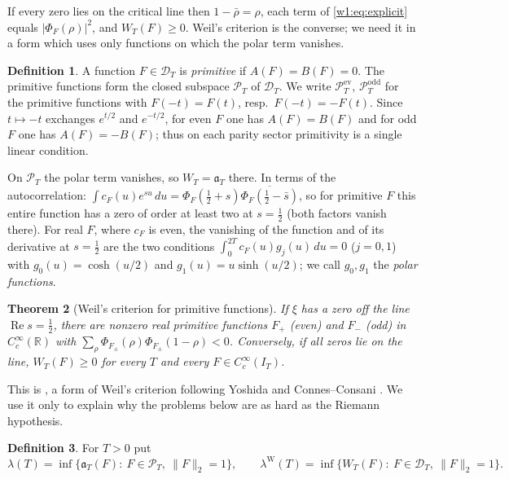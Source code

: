 \documentclass[11pt]{amsart}
\newtheorem{theorem}{Theorem}[section]
\theoremstyle{definition}
\newtheorem{definition}[theorem]{Definition}
\theoremstyle{remark}
\numberwithin{equation}{section}
\newcommand{\R}{\mathbb{R}}
\DeclareMathOperator{\Rel}{Re}
\newcommand{\IT}{I_T}                                  %
\newcommand{\cF}{c_F}                                  %
\newcommand{\PhiF}{\Phi_F}                             %
\newcommand{\PT}{\mathcal{P}_T}                        %
\newcommand{\DT}{\mathcal{D}_T}                        %
\newcommand{\aT}{\mathfrak{a}_T}                       %
\newcommand{\WT}{W_T}                                  %
\newcommand{\lam}{\lambda(T)}                          %
\newcommand{\lamW}{\lambda^{\mathrm W}(T)}             %
\begin{document}
If every zero lies on the critical line then $1-\bar\rho=\rho$, each term of
\eqref{w1:eq:explicit} equals $|\PhiF(\rho)|^2$, and $\WT(F)\ge0$. Weil's
criterion is the converse; we need it in a form which uses only functions
on which the polar term vanishes.

\begin{definition}\label{w1:def:primitive}
A function $F\in\DT$ is \emph{primitive} if $A(F)=B(F)=0$. The primitive
functions form the closed subspace $\PT$ of $\DT$. We write $\PT^{\mathrm{ev}}$,
$\PT^{\mathrm{odd}}$ for the primitive functions with $F(-t)=F(t)$,
resp.\ $F(-t)=-F(t)$. Since $t\mapsto -t$ exchanges $e^{t/2}$ and $e^{-t/2}$,
for even $F$ one has $A(F)=B(F)$ and for odd $F$ one has $A(F)=-B(F)$; thus
on each parity sector primitivity is a single linear condition.
\end{definition}

On $\PT$ the polar term vanishes, so $\WT=\aT$ there. In terms of the
autocorrelation: $\int\cF(u)e^{su}\,du=\PhiF(\frac12+s)\overline{\PhiF(\frac12-\bar s)}$,
so for primitive $F$ this entire function has a zero of order at least two at
$s=\frac12$ (both factors vanish there). For real $F$, where $\cF$ is even,
the vanishing of the function and of its derivative at $s=\frac12$ are the two
conditions $\int_0^{2T}\cF(u)g_j(u)\,du=0$ ($j=0,1$) with $g_0(u)=\cosh(u/2)$
and $g_1(u)=u\sinh(u/2)$; we call $g_0,g_1$ the \emph{polar functions}.

\begin{theorem}[Weil's criterion for primitive functions]\label{w1:thm:criterion}
If $\xi$ has a zero off the line $\Rel s=\frac12$, there are nonzero real
primitive functions $F_+$ (even) and $F_-$ (odd) in $C_c^\infty(\R)$ with
$\sum_\rho\Phi_{F_\pm}(\rho)\Phi_{F_\pm}(1-\rho)<0$. Conversely, if all zeros
lie on the line, $\WT(F)\ge0$ for every $T$ and every $F\in C_c^\infty(\IT)$.
\end{theorem}

This is \cite[Theorem~6.2]{P45}, a form of Weil's criterion \cite{Weil52}
following Yoshida \cite{Yoshida1992} and Connes--Consani
\cite{ConnesConsani2021}. We use it only to explain why the problems below
are as hard as the Riemann hypothesis.

\begin{definition}\label{w1:def:lambda}
For $T>0$ put
\[
  \lam=\inf\{\aT(F):\ F\in\PT,\ \|F\|_2=1\},\qquad
  \lamW=\inf\{\WT(F):\ F\in\DT,\ \|F\|_2=1\}.
\]
\end{definition}
\end{document}
